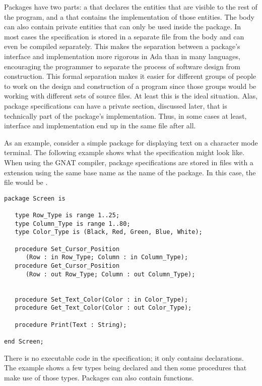 Packages have two parts: a  that declares the entities that are visible
to the rest of the program, and a  that contains the implementation of those
entities. The body can also contain private entities that can only be used inside the package.
In most cases the specification is stored in a separate file from the body and can even be
compiled separately. This makes the separation between a package's interface and implementation
more rigorous in Ada than in many languages, encouraging the programmer to separate the process
of software design from construction. This formal separation makes it easier for different
groups of people to work on the design and construction of a program since those groups would be
working with different sets of source files. At least this is the ideal situation. Alas, package
specifications can have a private section, discussed later, that is technically part of the
package's implementation. Thus, in some cases at least, interface and implementation end up in
the same file after all.

As an example, consider a simple package for displaying text on a character mode terminal. The
following example shows what the specification might look like. When using the GNAT compiler,
package specifications are stored in files with a  extension using the same base
name as the name of the package. In this case, the file would be .

\begin{lstlisting}
package Screen is

   type Row_Type is range 1..25;
   type Column_Type is range 1..80;
   type Color_Type is (Black, Red, Green, Blue, White);

   procedure Set_Cursor_Position
      (Row : in Row_Type; Column : in Column_Type);
   procedure Get_Cursor_Position
      (Row : out Row_Type; Column : out Column_Type);


   procedure Set_Text_Color(Color : in Color_Type);
   procedure Get_Text_Color(Color : out Color_Type);

   procedure Print(Text : String);

end Screen;
\end{lstlisting}

There is no executable code in the specification; it only contains declarations. The example
shows a few types being declared and then some procedures that make use of those types. Packages
can also contain functions.


